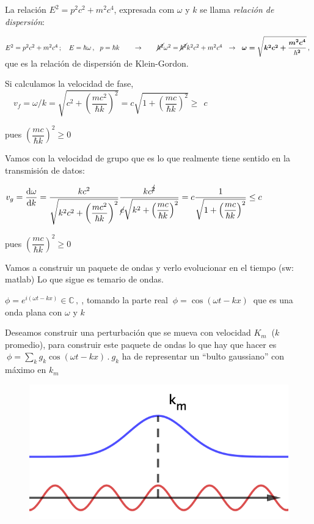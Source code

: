 \vspace{1cm}
La relación $E^2=p^2c^2+m^2c^4$, expresada com $\omega$ y $k$ se llama \emph{relación de dispersión}:

$E^2=p^2c^2+m^2c^4 \, ; \quad E=\hbar \omega\, , \ \ p=\hbar k \qquad \to \qquad \cancel{\hbar^2}\omega^2=\cancel{\hbar^2}k^2 c^2 + m^2 c^4 \ \ \to \ \ \boldsymbol{ \omega=\sqrt{k^2c^2+\dfrac{m^2c^4}{\hbar^2}}}\, , \ $ que es la relación de dispersión de Klein-Gordon.

Si calculamos la velocidad de fase, $\quad v_f=\omega/k=\sqrt{c^2+\left( \dfrac{mc^2}{\hbar k} \right)^2 } = c \sqrt{1+\left( \dfrac{mc}{\hbar k} \right)^2} \geq   \ \ c$ \begin{scriptsize} \textcolor{gris}{pues $ \left( \dfrac{mc}{\hbar k} \right)^2 \geq 0 $} \end{scriptsize}

Vamos con la velocidad de grupo que es lo que realmente tiene sentido en la transmisión de datos:

$v_g=\displaystyle \dv{\omega}{k}=
\dfrac{kc^2}
{
\sqrt{
k^2c^2+\left( \dfrac{mc^2}{\hbar k} \right)^2
}
}	
\dfrac{k c^{\cancel{2}}}
{\cancel{c} \sqrt{k^2 + \left( \dfrac{mc}{\hbar k} \right)^2} }=c \dfrac{1}{\sqrt{1 + \left( \dfrac{mc}{\hbar k} \right)^2}} \leq c \quad $ 
\begin{scriptsize} \textcolor{gris}{pues $ \left( \dfrac{mc}{\hbar k} \right)^2 \geq 0 $} \end{scriptsize}


\vspace{5mm} Vamos a construir un paquete de ondas y verlo evolucionar en el tiempo \textcolor{gris}{ (sw: matlab) Lo que sigue es temario de ondas.} 


$\phi=e^{i(\omega t-kx)} \in \mathbb C\, , \ $, tomando la parte real  $\ \phi=\cos(\omega t-kx)\ $ que es una onda plana con $\omega$ y $k$



\begin{multicols}{2}
Deseamos construir una perturbación que se mueva con velocidad $K_m\ $ ($k$ promedio), para construir este paquete de ondas lo que hay que hacer es $\ \phi=\displaystyle \sum_k g_k \cos(\omega t-kx)\, . \  g_k $ ha de representar un ``bulto gaussiano'' con máximo en $k_m$
\begin{figure}[H]
	\centering
	\includegraphics[width=.30\textwidth]{imagenes/img33-07.png}
\end{figure}	
\end{multicols}	


